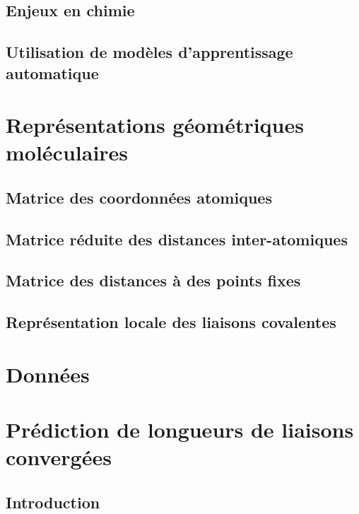 \documentclass{report}
\begin{document}
	\section{Enjeux en chimie}
		
	\section{Utilisation de modèles d'apprentissage automatique}
		
		
\chapter{Représentations géométriques moléculaires}
	
	\section{Matrice des coordonnées atomiques}
		

	\section{Matrice réduite des distances inter-atomiques}
		
		
	\section{Matrice des distances à des points fixes}
		
		
	\section{Représentation locale des liaisons covalentes}
		

\chapter{Données}
	

\chapter{Prédiction de longueurs de liaisons convergées}
	\label{dist_rel_chap}

	\section{Introduction}
		
\end{document}
